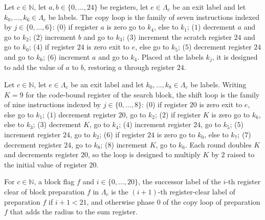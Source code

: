 \begin{definition}
\label{Complexity.LogProg.SavitchARM.dpCopyI}
\leanok
{}
Let $c\in\mathbb{N}$, let $a,b\in\{0,\dots,24\}$ be registers, let $e\in\Lambda_c$ be an exit label
and let $k_0,\dots,k_6\in\Lambda_c$ be labels. The copy loop is the family of seven instructions
indexed by $j\in\{0,\dots,6\}$: ($0$) if register $a$ is zero go to $k_4$, else to $k_1$; ($1$)
decrement $a$ and go to $k_2$; ($2$) increment $b$ and go to $k_3$; ($3$) increment the scratch
register $24$ and go to $k_0$; ($4$) if register $24$ is zero exit to $e$, else go to $k_5$; ($5$)
decrement register $24$ and go to $k_6$; ($6$) increment $a$ and go to $k_4$. Placed at the labels
$k_j$, it is designed to add the value of $a$ to $b$, restoring $a$ through register $24$.
\end{definition}

\begin{definition}
\label{Complexity.LogProg.SavitchARM.dpShlI}
\leanok
{}
Let $c\in\mathbb{N}$, let $e\in\Lambda_c$ be an exit label and let $k_0,\dots,k_8\in\Lambda_c$ be
labels. Writing $K=9$ for the code-bound register of the search block, the shift loop is the family
of nine instructions indexed by $j\in\{0,\dots,8\}$: ($0$) if register $20$ is zero exit to $e$,
else go to $k_1$; ($1$) decrement register $20$, go to $k_2$; ($2$) if register $K$ is zero go to
$k_6$, else to $k_3$; ($3$) decrement $K$, go to $k_4$; ($4$) increment register $24$, go to $k_5$;
($5$) increment register $24$, go to $k_2$; ($6$) if register $24$ is zero go to $k_0$, else to
$k_7$; ($7$) decrement register $24$, go to $k_8$; ($8$) increment $K$, go to $k_6$. Each round
doubles $K$ and decrements register $20$, so the loop is designed to multiply $K$ by $2$ raised to
the initial value of register $20$.
\end{definition}

\begin{definition}
\label{Complexity.LogProg.SavitchARM.dpCbEx}
\leanok
{}
For $c\in\mathbb{N}$, a block flag $f$ and $i\in\{0,\dots,20\}$, the successor label of the $i$-th
register clear of block preparation $f$ in $\Lambda_c$ is the $(i+1)$-th register-clear label of
preparation $f$ if $i+1<21$, and otherwise phase $0$ of the copy loop of preparation $f$ that adds
the radius to the sum register.
\end{definition}

